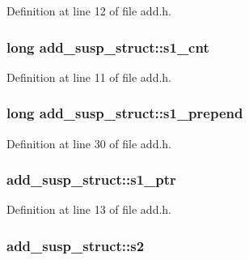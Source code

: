 Definition at line 12 of file add.\+h.

\subsubsection[{\texorpdfstring{s1\+\_\+cnt}{s1_cnt}}]{\setlength{\rightskip}{0pt plus 5cm}long add\+\_\+susp\+\_\+struct\+::s1\+\_\+cnt}\hypertarget{structadd__susp__struct_a29251ea236e564c0e4d9ed83bf16a004}{}\label{structadd__susp__struct_a29251ea236e564c0e4d9ed83bf16a004}


Definition at line 11 of file add.\+h.

\subsubsection[{\texorpdfstring{s1\+\_\+prepend}{s1_prepend}}]{\setlength{\rightskip}{0pt plus 5cm}long add\+\_\+susp\+\_\+struct\+::s1\+\_\+prepend}\hypertarget{structadd__susp__struct_a3a5985ce08a9c25799cfa67a1b59065d}{}\label{structadd__susp__struct_a3a5985ce08a9c25799cfa67a1b59065d}


Definition at line 30 of file add.\+h.

\subsubsection[{\texorpdfstring{s1\+\_\+ptr}{s1_ptr}}]{ add\+\_\+susp\+\_\+struct\+::s1\+\_\+ptr}\hypertarget{structadd__susp__struct_a621a8acac0e8b8a1713e83f58a022b35}{}\label{structadd__susp__struct_a621a8acac0e8b8a1713e83f58a022b35}


Definition at line 13 of file add.\+h.

\subsubsection[{\texorpdfstring{s2}{s2}}]{ add\+\_\+susp\+\_\+struct\+::s2}\hypertarget{structadd__susp__struct_a7996852fa45251733bcc3f354a80b61b}{}\label{structadd__susp__struct_a7996852fa45251733bcc3f354a80b61b}


